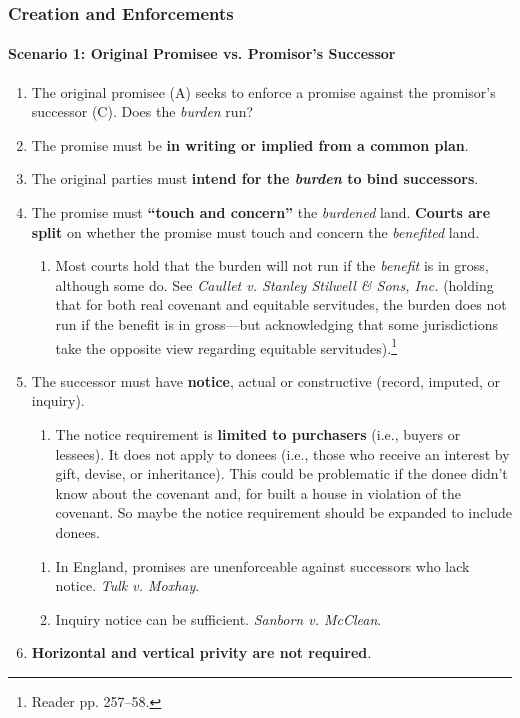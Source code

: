 \subsubsection{Creation and Enforcements}

\paragraph{Scenario 1: Original Promisee vs. Promisor's Successor}

\begin{enumerate}
    \item The original promisee (A) seeks to enforce a promise against the 
    promisor's  successor (C). Does the \emph{burden} run?
    \item The promise must be \textbf{in writing or implied from a common 
    plan}.
    \item The original parties must \textbf{intend for the \emph{burden} to 
    bind successors}.
    \item The promise must \textbf{``touch and concern''} the \emph{burdened} 
    land. \textbf{Courts are split} on whether the promise must touch and 
    concern the \emph{benefited} land.
    \begin{enumerate}
        \item Most courts hold that the burden will not run if the 
        \emph{benefit} is in gross, although some do. See \emph{Caullet v. 
        Stanley Stilwell \& Sons, Inc.} (holding that for both real covenant 
        and equitable servitudes, the burden does not run 
        if the benefit is in gross---but acknowledging that some jurisdictions 
        take the opposite view regarding equitable 
        servitudes).\footnote{Reader pp. 257--58.}
    \end{enumerate}
    \item The successor must have \textbf{notice}, actual or constructive 
    (record, imputed, or inquiry).
    \begin{enumerate}
        \item The notice requirement is \textbf{limited to purchasers} (i.e., 
        buyers or lessees). It does not apply to donees (i.e., those who 
        receive an interest by gift, devise, or inheritance). This could be 
        problematic if the donee didn't know about the covenant and, for 
        built a house in violation of the covenant. So maybe the notice 
        requirement should be expanded to include donees. 
    \end{enumerate}
    \begin{enumerate}
        \item In England, promises are unenforceable against successors who 
        lack notice. \emph{Tulk v. Moxhay}.
        \item Inquiry notice can be sufficient. \emph{Sanborn v. McClean}.
    \end{enumerate}
    \item \textbf{Horizontal and vertical privity are not required}.
\end{enumerate}

